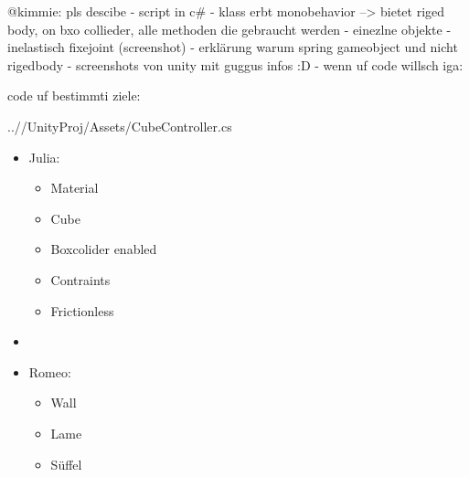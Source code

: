 \documentclass[../main.tex]{subfiles}
\begin{document}
    @kimmie: pls descibe
    - script in c#
    - klass erbt monobehavior
    --> bietet riged body, on bxo collieder, alle methoden die gebraucht werden
    - einezlne objekte
    - inelastisch fixejoint (screenshot)
    - erklärung warum spring gameobject und nicht rigedbody
    - screenshots von unity mit guggus infos :D
    - wenn uf code willsch iga:


  code uf bestimmti ziele:
    \begin{lstinputlisting}[label={lst:graphInelastic}, firstline=7, lastline=12]
    {..//UnityProj/Assets/CubeController.cs}
    \end{lstinputlisting}

    \begin{itemize}
        \item Julia:
        \begin{itemize}
            \item Material
            \item Cube
            \item Boxcolider enabled
            \item Contraints
            \item Frictionless
        \end{itemize}

        \item \item Romeo:
        \begin{itemize}
            \item Wall
            \item Lame
            \item Süffel
        \end{itemize}
    \end{itemize}
\end{document}
